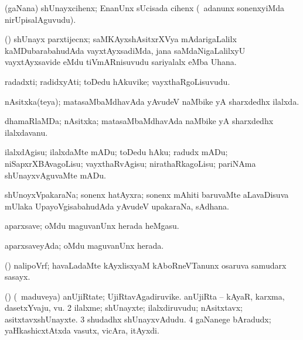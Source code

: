 \bentry
{}
\gl{\nA}
\bmng
(gaNana) shUnayxcihenx; EnanUnx sUcisada cihenx (\kanmu\ adanunx sonenxyiMda nirUpisalAguvudu). 
\emng
\eentry

\bentry
{}
\gl{\nA}
\bmng
(\saMshA) shUnayx parxtijecnx; saMKAyxshAsitxrXVya mAdarigaLalilx kaMDubarabahudAda vayxtAyxsadiMda, jana saMdaNigaLalilxyU vayxtAyxsavide eMdu tiVmARnisuvudu sariyalalx eMba Uhana. 
\emng
\eentry

\bentry
{}
\gl{\nA}
\bmng
radadxti; radidxyAti; toDedu hAkuvike; vayxthaRgoLisuvudu. 
\emng
\eentry

\bentry
{}
\gl{\gu}
\bmng
nAsitxka(teya); matasaMbaMdhavAda yAvudeV naMbike yA sharxdedhx ilalxda. 
\emng
\eentry

\bentry
{}
\gl{\nA}
\bmng
dhamaRlaMDa; nAsitxka; matasaMbaMdhavAda naMbike yA sharxdedhx ilalxdavanu. 
\emng
\eentry

\bentry
{}
\gl{\sakirx}
\bmng
ilalxdAgisu; ilalxdaMte mADu; toDedu hAku; radudx mADu; niSapxrXBAvagoLisu; vayxthaRvAgisu; nirathaRkagoLisu; pariNAma shUnayxvAguvaMte mADu. 
\emng
\eentry


\bentry
{}
\gl{\nA}
\bmng
shUnoyxVpakaraNa; sonenx hatAyxra; sonenx mAhiti baruvaMte aLavaDisuva mUlaka UpayoVgisabahudAda yAvudeV upakaraNa, sAdhana. 
\emng
\eentry

\bentry
{}
\gl{\nA}
\bmng
aparxsave; oMdu maguvanUnx herada heMgasu. 
\emng
\eentry

\bentry
{}
\gl{\gu}
\bmng
aparxsaveyAda; oMdu maguvanUnx herada. 
\emng
\eentry

\bentry
{}
\gl{\nA}
\bmng
(\jiVvi) nalipoVrf; havaLadaMte kAyxlisxyaM kAboRneVTanunx osaruva samudarx sasayx. 
\emng
\eentry

\bentry
{}
\gl{\nA}
\bmng
\bnum
{} (\nAyxshA) 
\banum
{} (\kanmu\ maduveya) anUjiRtate; UjiRtavAgadiruvike. 
 anUjiRta -- kAyaR, karxma, dasetxYvaju, \mo vu. 
\eanum
\numie
\num{2} ilalxme; shUnayxte; ilalxdiruvudu; nAsitxtavx; asitxtavxshUnayxte. 
\num{3} shudadhx shUnayxvAdudu. 
\num{4} gaNanege bAradudx; yaHkashicxtAtxda vasutx, vicAra, itAyxdi. 
\enum
\emng
\eentry

